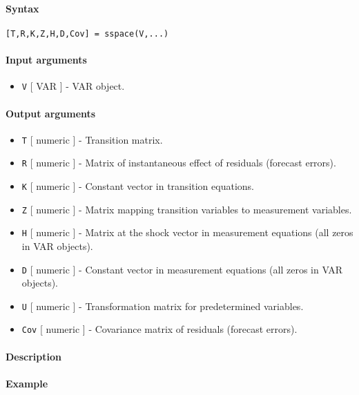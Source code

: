 


	\paragraph{Syntax}\label{syntax}

\begin{verbatim}
[T,R,K,Z,H,D,Cov] = sspace(V,...)
\end{verbatim}

\paragraph{Input arguments}\label{input-arguments}

\begin{itemize}
\itemsep1pt\parskip0pt
\item
  \texttt{V} {[} VAR {]} - VAR object.
\end{itemize}

\paragraph{Output arguments}\label{output-arguments}

\begin{itemize}
\item
  \texttt{T} {[} numeric {]} - Transition matrix.
\item
  \texttt{R} {[} numeric {]} - Matrix of instantaneous effect of
  residuals (forecast errors).
\item
  \texttt{K} {[} numeric {]} - Constant vector in transition equations.
\item
  \texttt{Z} {[} numeric {]} - Matrix mapping transition variables to
  measurement variables.
\item
  \texttt{H} {[} numeric {]} - Matrix at the shock vector in measurement
  equations (all zeros in VAR objects).
\item
  \texttt{D} {[} numeric {]} - Constant vector in measurement equations
  (all zeros in VAR objects).
\item
  \texttt{U} {[} numeric {]} - Transformation matrix for predetermined
  variables.
\item
  \texttt{Cov} {[} numeric {]} - Covariance matrix of residuals
  (forecast errors).
\end{itemize}

\paragraph{Description}\label{description}

\paragraph{Example}\label{example}


